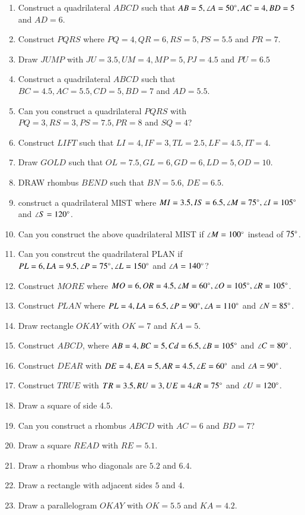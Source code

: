 \renewcommand{\theequation}{\theenumi}
\begin{enumerate}[label=\arabic*.,ref=\thesubsection.\theenumi]


\item Construct a quadrilateral $ABCD$ such that $AB=5, \angle A = 50\degree, AC = 4, BD = 5$ and $AD = 6$.
\item Construct $PQRS$ where $PQ = 4, QR = 6, RS = 5, PS = 5.5$ and $PR = 7$.
\item Draw $JUMP$ with $JU = 3.5, UM=4, MP = 5, PJ =4.5$ and $PU = 6.5$
\item Construct a quadrilateral $ABCD$ such that $BC=4.5,  AC = 5.5, CD = 5, BD = 7$ and $AD = 5.5$.
\item Can you construct a quadrilateral $PQRS$ with $PQ=3, RS=3, PS=7.5, PR=8$ and $SQ=4$?
\item Construct $LIFT$ such that $LI = 4, IF = 3, TL = 2.5, LF = 4.5, IT=4$.
\item Draw $GOLD$ such that $OL=7.5, GL=6, GD=6, LD = 5, OD = 10$.
\item DRAW rhombus $BEND$ such that $BN = 5.6$, $DE = 6.5$.
\item construct a quadrilateral MIST where $MI = 3.5, IS = 6.5, \angle M = 75 \degree, \angle I = 105 \degree$ and $\angle S = 120 \degree$.
\item Can you construct the above quadrilateral MIST if $\angle M = 100 \degree$ instead of $75 \degree$.
\item Can you constrcut the quadrilateral PLAN if $PL = 6, LA = 9.5, \angle P = 75 \degree, \angle L = 150 \degree$ and $\angle A = 140 \degree$?
\item Construct $MORE$ where $MO = 6, OR = 4.5, \angle M = 60 \degree, \angle O = 105 \degree, \angle R = 105 \degree$.
\item Construct $PLAN$ where $PL = 4, LA = 6.5, \angle P = 90 \degree, \angle A = 110\degree$ and $\angle N = 85\degree$.
\item Draw  rectangle $OKAY$ with $OK = 7$ and $KA = 5$.
\item Construct $ABCD $, where $AB = 4, BC = 5, Cd = 6.5, \angle B = 105 \degree$ and $\angle C = 80\degree$.
\item Construct $DEAR$ with $DE = 4, EA = 5, AR = 4.5, \angle E = 60 \degree$ and $\angle A = 90 \degree$.\item Construct $TRUE$ with $TR = 3.5, RU = 3, UE = 4 \angle R = 75\degree$ and $\angle U = 120\degree$.
\item Draw a square of side 4.5.

\item Can you construct a rhombus $ABCD$ with $AC = 6$ and $BD = 7$?
\item Draw a square $READ$ with $RE = 5.1$.
\item Draw a rhombus who diagonals are $5.2$ and $6.4$.
\item Draw a rectangle with adjacent sides $5$ and $4$.
\item Draw a parallelogram $OKAY$ with $OK = 5.5$ and $KA = 4.2$.


\end{enumerate}
%
